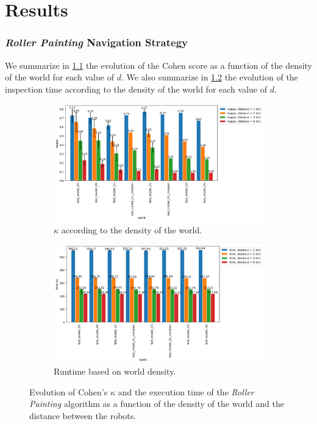 
\chapter{Results}

\subsection*{\textit{Roller Painting} Navigation Strategy}

We summarize in \ref{fig:peinture_au_rouleau-kappa_vs_world} the evolution of the Cohen score as a function of the density of the world for each value of $d$.
We also summarize in \ref{fig:peinture_au_rouleau-time_vs_world} the evolution of the inspection time according to the density of the world for each value of $d$.

\begin{figure}[h!]
	\centering
	\begin{subfigure}[t]{0.99\linewidth}
		\includegraphics[width=\linewidth]{graphics/peinture_au_rouleau-kappa_vs_world_for_each_d.png}
		\caption{$\kappa$ according to the density of the world.}
		\label{fig:peinture_au_rouleau-kappa_vs_world}
	\end{subfigure}
	\hfill
	\begin{subfigure}[t]{0.99\linewidth}
			\includegraphics[width=\linewidth]{graphics/peinture_au_rouleau-time_vs_world_for_each_d.png}
			\caption{Runtime based on world density.}
			\label{fig:peinture_au_rouleau-time_vs_world}
	\end{subfigure}
	\caption{Evolution of Cohen's $\kappa$ and the execution time of the \textit{Roller Painting} algorithm as a function of the density of the world and the distance between the robots.}
	\label{fig:peinture_au_rouleau-world}
\end{figure}

